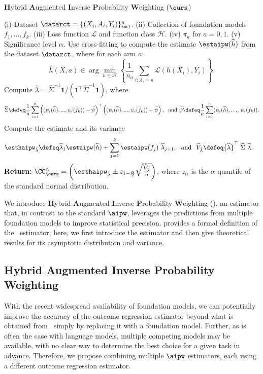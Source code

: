 \begin{algorithm*}[t]
\caption{\textbf{H}ybrid \textbf{A}ugmented \textbf{I}nverse \textbf{P}robability \textbf{W}eighting ($\ours$)}
\label{algo:haipw}
\begin{algorithmic}[1]
\REQUIRE (i) Dataset $\datarct = \{(X_i, A_i, Y_i)\}_{i=1}^n$. (ii) Collection of foundation models  $f_1,\ldots,  f_k$.  (iii) Loss function $\mathcal{L}$ and function class $\mathcal{H}$. 
(iv) $\pi_a$ for $a=0,1$.
(v) Significance level $\alpha$. 
\STATE Use cross-fitting to compute the estimate $\estaipw(\widehat h)$ from the dataset $\datarct$, where for each arm  $a$:
$$
\widehat{h}(X,a) \in \arg\min_{h\in\mathcal{H}} \left\{\frac{1}{n_a}\sum_{i:A_i=a}\mathcal{L}(h(X_i), Y_i)\right\}.
$$\vspace{-4mm}
\STATE Compute  $\widehat \lambda =   \widehat \Sigma^{-1} \mathbf 1 / (\mathbf 1^\top \widehat \Sigma^{-1} \mathbf 1) $,
where 
$$
\widehat \Sigma \defeq  \frac{1}{n}\sum_{i=1}^n \left((\psi_i(\widehat{h}) , ..., \psi_i(f_k)) - \bar  \psi\right)^\top \left((\psi_i(\widehat{h}), ..., \psi_i(f_k)) - \bar  \psi \right),~~\text{and}~\bar{\psi} \defeq \frac{1}{n} \sum_{i=1}^n (\psi_i( \widehat{h}), \dots, \psi_i( f_k)). 
$$
\STATE Compute the estimate and its variance 
\begin{align}
\label{eq:haipw}
& \esthaipw_{\hat \lambda} \defeq \widehat \lambda_1 \estaipw(\widehat h) + \sum_{j=1}^{k} \estaipw(f_j)~ \widehat \lambda_{j+1},~~\text{and}~~\widehat V_{\hat \lambda} \defeq {\widehat \lambda}^\top~ \widehat\Sigma~ \widehat\lambda.
\end{align}
\STATE \textbf{Return:}  $
\CC^\alpha_{\ours} = \left( \esthaipw_{\hat \lambda} \pm z_{1-\frac{\alpha}{2}} \sqrt{\frac{\widehat V_{\hat \lambda}}{n}} \right)$, where $z_\alpha$ is the $\alpha$-quantile of the standard normal distribution.
\end{algorithmic}
\end{algorithm*}




We introduce \textbf{H}ybrid \textbf{A}ugmented \textbf{I}nverse \textbf{P}robability \textbf{W}eighting (\ours), an estimator that, in contrast to the standard $\aipw$, leverages the predictions from multiple foundation models to improve statistical precision.  provides a formal definition of the \ours~estimator; here, we first introduce the estimator and then give theoretical results for its asymptotic distribution and variance.

\subsection{Hybrid Augmented Inverse Probability Weighting}
With the recent widespread availability of foundation models, we can potentially improve the accuracy of the outcome regression estimator beyond what is obtained from~ simply by replacing it with a foundation model. Further, as is often the case with language models, multiple competing models may be available, with no clear way to determine the best choice for a given task in advance. Therefore, we propose combining multiple $\aipw$ estimators, each using a different outcome regression estimator.

